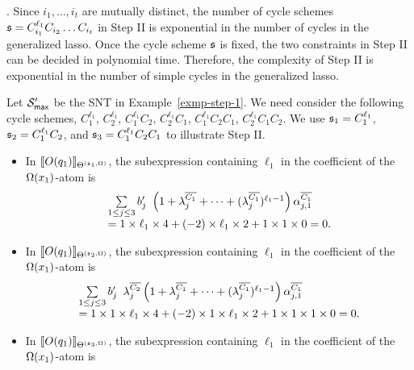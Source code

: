 . Since $i_1,\dots, i_t$ are mutually distinct, the number of cycle schemes ${\mathfrak{s} } = C_{i_1}^{\ell_1} C_{i_2} \dots C_{i_t}$ in Step II is exponential in the number of cycles in the generalized lasso. Once the cycle scheme ${\mathfrak{s} }$ is fixed, the two constraints in Step II can be decided in polynomial time. Therefore, the complexity of Step II is exponential in the number of simple cycles in the generalized lasso.



\begin{example}\label{exmp-step-2}
Let ${\mathcal{S} }'_{\sf max}$ be the SNT in Example~\ref{exmp-step-1}. We need consider the following cycle schemes, $C^{\ell_1}_1$, $C^{\ell_1}_2$, $C^{\ell_1}_1 C_2$, $C^{\ell_1}_2 C_1$, $C^{\ell_1}_1 C_2 C_1$, $C^{\ell_1}_2 C_1 C_2$. We use ${\mathfrak{s} }_1 = C^{\ell_1}_1$, ${\mathfrak{s} }_2 = C^{\ell_1}_1 C_2$, and ${\mathfrak{s} }_3 = C^{\ell_1}_1 C_2 C_1$ to illustrate Step II.
\begin{itemize}
\item In $\llbracket O(q_1)\rrbracket_{\Theta^{({\mathfrak{s} }_1, \Omega)}}$,  the subexpression containing $\ell_1$ in the coefficient of the $\Omega(x_1)$-atom is
\[
\begin{array} {l}
\sum \limits_{1 \le j \le 3} b'_j
\begin{array}{l}
\left(1+\lambda^{\overline{C_{1}}}_{j} + \dots + (\lambda^{\overline{C_{1}}}_{j})^{\ell_1-1} \right) \alpha^{\overline{C_{1}}}_{j, 1}
\end{array}
\\
= 1 \times \ell_1 \times 4 +  (-2) \times \ell_1 \times 2 + 1 \times 1 \times 0 = 0.
\end{array}
\]
%
\item In $\llbracket O(q_1)\rrbracket_{\Theta^{({\mathfrak{s} }_2, \Omega)}}$, the subexpression containing $\ell_1$ in the coefficient of the $\Omega(x_1)$-atom is 
\[
\begin{array}{l}
\sum \limits_{1 \le j \le 3} b'_j
\begin{array}{l}
 \lambda^{\overline{C_{2}}}_{j}
\left(1+\lambda^{\overline{C_{1}}}_{j} + \dots + (\lambda^{\overline{C_{1}}}_{j})^{\ell_1-1} \right) \alpha^{\overline{C_{1}}}_{j, 1}
\end{array}
\\
= 1 \times 1 \times \ell_1 \times 4 + (-2) \times 1 \times \ell_1 \times 2 + 1 \times 1 \times 1 \times 0 =0.
\end{array}
\]
%
\item In $\llbracket O(q_1)\rrbracket_{\Theta^{({\mathfrak{s} }_3, \Omega)}}$, the subexpression containing $\ell_1$ in the coefficient of the $\Omega(x_1)$-atom is 

\end{itemize}
\end{example}
